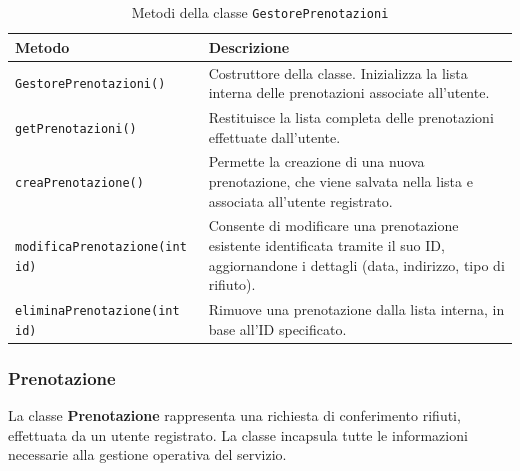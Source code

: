 \begin{table}[H]
\centering
\begin{tabularx}{\textwidth}{|l|X|}
\hline
\textbf{Metodo} & \textbf{Descrizione} \\
\hline
\texttt{GestorePrenotazioni()} & Costruttore della classe. Inizializza la lista interna delle prenotazioni associate all’utente. \\
\hline
\texttt{getPrenotazioni()} & Restituisce la lista completa delle prenotazioni effettuate dall’utente. \\
\hline
\texttt{creaPrenotazione()} & Permette la creazione di una nuova prenotazione, che viene salvata nella lista e associata all’utente registrato. \\
\hline
\texttt{modificaPrenotazione(int id)} & Consente di modificare una prenotazione esistente identificata tramite il suo ID, aggiornandone i dettagli (data, indirizzo, tipo di rifiuto). \\
\hline
\texttt{eliminaPrenotazione(int id)} & Rimuove una prenotazione dalla lista interna, in base all’ID specificato. \\
\hline
\end{tabularx}
\caption{Metodi della classe \texttt{GestorePrenotazioni}}
\end{table}

\subsubsection{Prenotazione}

La classe \textbf{Prenotazione} rappresenta una richiesta di conferimento rifiuti, effettuata da un utente registrato. La classe incapsula tutte le informazioni necessarie alla gestione operativa del servizio.

